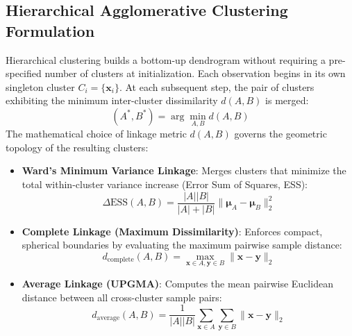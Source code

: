 \documentclass[12pt]{article}
\begin{document}
\subsection{Hierarchical Agglomerative Clustering Formulation}
Hierarchical clustering builds a bottom-up dendrogram without requiring a pre-specified number of clusters at initialization. Each observation begins in its own singleton cluster $C_i = \{\mathbf{x}_i\}$. At each subsequent step, the pair of clusters exhibiting the minimum inter-cluster dissimilarity $d(A, B)$ is merged:
\begin{equation}
(A^*, B^*) = \arg\min_{A, B} d(A, B)
\end{equation}
The mathematical choice of linkage metric $d(A, B)$ governs the geometric topology of the resulting clusters:
\begin{itemize}
    \item \textbf{Ward's Minimum Variance Linkage}: Merges clusters that minimize the total within-cluster variance increase (Error Sum of Squares, ESS):
    \begin{equation}
    \Delta \text{ESS}(A, B) = \frac{|A||B|}{|A| + |B|} \|\boldsymbol{\mu}_A - \boldsymbol{\mu}_B\|_2^2
    \end{equation}
    \item \textbf{Complete Linkage (Maximum Dissimilarity)}: Enforces compact, spherical boundaries by evaluating the maximum pairwise sample distance:
    \begin{equation}
    d_{\text{complete}}(A, B) = \max_{\mathbf{x} \in A, \mathbf{y} \in B} \|\mathbf{x} - \mathbf{y}\|_2
    \end{equation}
    \item \textbf{Average Linkage (UPGMA)}: Computes the mean pairwise Euclidean distance between all cross-cluster sample pairs:
    \begin{equation}
    d_{\text{average}}(A, B) = \frac{1}{|A||B|} \sum_{\mathbf{x} \in A} \sum_{\mathbf{y} \in B} \|\mathbf{x} - \mathbf{y}\|_2
    \end{equation}
\end{itemize}
\end{document}
